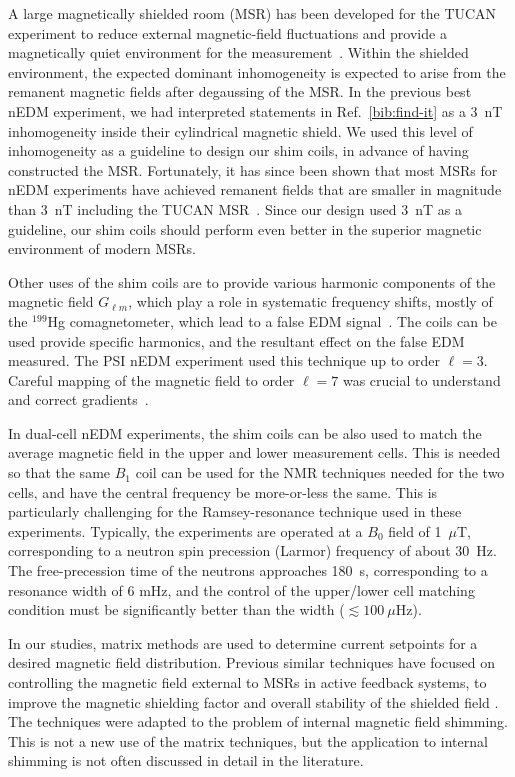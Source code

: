 \documentclass[preprint,12pt]{elsarticle}
\begin{document}
A large magnetically shielded room (MSR) has been developed for the
TUCAN experiment to reduce external magnetic-field fluctuations and
provide a magnetically quiet environment for the
measurement~\cite{bib:msr_rsi}.  Within the shielded environment, the
expected dominant inhomogeneity is expected to arise from the remanent
magnetic fields after degaussing of the MSR.  In the previous best
nEDM experiment, we had interpreted statements in
Ref.~\ref{bib:find-it} as a 3~nT inhomogeneity inside their
cylindrical magnetic shield.  We used this level of inhomogeneity as a
guideline to design our shim coils, in advance of having constructed
the MSR.  Fortunately, it has since been shown that most MSRs for nEDM
experiments have achieved remanent fields that are smaller in
magnitude than 3~nT \cite{bib:fierlinger,bib:n2edmmsr1,bib:n2edmmsr2}
including the TUCAN MSR~\cite{bib:msr_rsi}.  Since our design used
3~nT as a guideline, our shim coils should perform even better in the
superior magnetic environment of modern MSRs.

Other uses of the shim coils are to provide various harmonic
components of the magnetic field $G_{\ell m}$, which play a role in
systematic frequency shifts, mostly of the $^{199}$Hg comagnetometer,
which lead to a false EDM signal~\cite{bib:Abel2019-I-think}.  The
coils can be used provide specific harmonics, and the resultant effect
on the false EDM measured.  The PSI nEDM experiment used this
technique up to order $\ell=3$.  Careful mapping of the magnetic field
to order $\ell=7$ was crucial to understand and correct
gradients~\cite{bib:Abel2022Mapping}.

In dual-cell nEDM experiments, the shim coils can be also used to
match the average magnetic field in the upper and lower measurement
cells.  This is needed so that the same $B_1$ coil can be used for the
NMR techniques needed for the two cells, and have the central
frequency be more-or-less the same.  This is particularly challenging
for the Ramsey-resonance technique used in these experiments.
Typically, the experiments are operated at a $B_0$ field of 1~$\mu$T,
corresponding to a neutron spin precession (Larmor) frequency of about
30~Hz.  The free-precession time of the neutrons approaches 180~s,
corresponding to a resonance width of 6 mHz, and the control of the
upper/lower cell matching condition must be significantly better than
the width ($\lesssim 100~\mu$Hz).

In our studies, matrix methods are used to determine current setpoints
for a desired magnetic field distribution.  Previous similar
techniques have focused on controlling the magnetic field external to
MSRs in active feedback systems, to improve the magnetic shielding
factor and overall stability of the shielded field
\cite{bib:franke-thesis,bib:rawlik-thesis,bib:shomi-thesis,bib:rawlik-amjphys,bib:abel-epjc-2023,bib:arxiv2601.22960}.
The techniques were adapted to the problem of internal magnetic field
shimming.  This is not a new use of the matrix techniques, but the
application to internal shimming is not often discussed in detail in
the literature.
\end{document}
